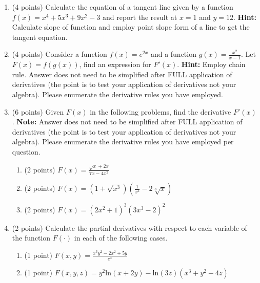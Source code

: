 \documentclass{article}%
\begin{document}
\begin{enumerate}
\item (4 points) Calculate the equation of a tangent line given by a function $f(x) = x^4 + 5x^3+9x^2-3$ and report the result at $x=1$ and $y = 12$. \textbf{Hint:} Calculate slope of function and employ point slope form of a line to get the tangent equation.

\item (4 points) Consider a function $f(x) = e^{2x}$ and a function $g(x) = \frac{x^2}{x-1}$. Let $F(x) = f(g(x))$, find an expression for $F'(x)$. \textbf{Hint:} Employ chain rule. Answer does not need to be simplified after FULL application of derivatives (the point is to test your application of derivatives not your algebra). Please enumerate the derivative rules you have employed.

\item (6 points) Given $F(x)$ in the following problems, find the derivative $F'(x)$. \textbf{Note:} Answer does not need to be simplified after FULL application of derivatives (the point is to test your application of derivatives not your algebra). Please enumerate the derivative rules you have employed per question.
\begin{enumerate}
    \item (2 points) $F(x) =\frac{\sqrt{x}+2x}{7x-4x^2}$\\
    \item (2 points) $F(x) = (1 + \sqrt{x^3})(\frac{1}{x^3} - 2\sqrt[3]{x})$\\
    \item (2 points) $F(x) = (2x^2+1)^3(3x^3-2)^2$\\
\end{enumerate}
\item (2 points) Calculate the partial derivatives with respect to each variable of the function $F(\cdot)$ in each of the following cases.
\begin{enumerate}
    \item (1 point) $F(x,y) = \frac{x^3y^2 - 2x^2 + 5y}{e^x}$\\
    \item (1 point) $F(x,y,z) = y^2\mathrm{ln}(x+2y) -  \mathrm{ln}(3z)(x^3 + y^2 -4z)$
\end{enumerate}



\end{enumerate}
\end{document}
